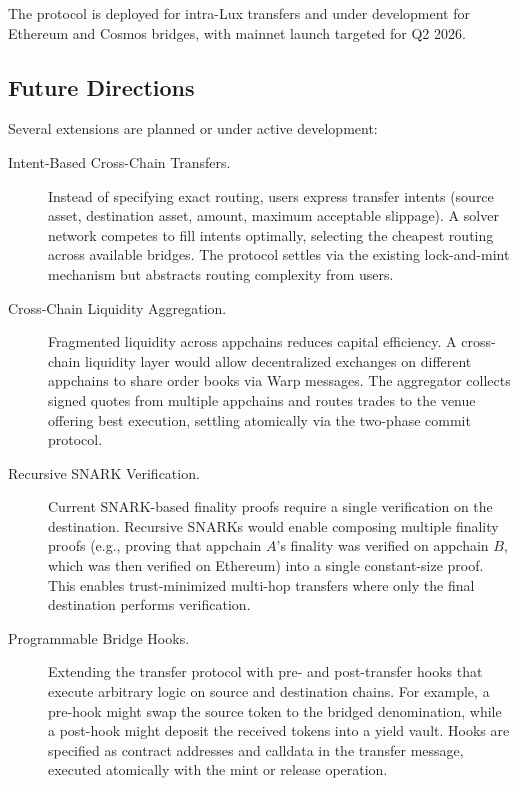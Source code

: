 \documentclass[11pt,a4paper]{article}
\begin{document}
The protocol is deployed for intra-Lux transfers and under development for Ethereum and Cosmos bridges, with mainnet launch targeted for Q2 2026.

\subsection{Future Directions}

Several extensions are planned or under active development:

\begin{description}
    \item[Intent-Based Cross-Chain Transfers.] Instead of specifying exact routing, users express transfer intents (source asset, destination asset, amount, maximum acceptable slippage). A solver network competes to fill intents optimally, selecting the cheapest routing across available bridges. The protocol settles via the existing lock-and-mint mechanism but abstracts routing complexity from users.

    \item[Cross-Chain Liquidity Aggregation.] Fragmented liquidity across appchains reduces capital efficiency. A cross-chain liquidity layer would allow decentralized exchanges on different appchains to share order books via Warp messages. The aggregator collects signed quotes from multiple appchains and routes trades to the venue offering best execution, settling atomically via the two-phase commit protocol.

    \item[Recursive SNARK Verification.] Current SNARK-based finality proofs require a single verification on the destination. Recursive SNARKs would enable composing multiple finality proofs (e.g., proving that appchain $A$'s finality was verified on appchain $B$, which was then verified on Ethereum) into a single constant-size proof. This enables trust-minimized multi-hop transfers where only the final destination performs verification.

    \item[Programmable Bridge Hooks.] Extending the transfer protocol with pre- and post-transfer hooks that execute arbitrary logic on source and destination chains. For example, a pre-hook might swap the source token to the bridged denomination, while a post-hook might deposit the received tokens into a yield vault. Hooks are specified as contract addresses and calldata in the transfer message, executed atomically with the mint or release operation.
\end{description}
\end{document}
